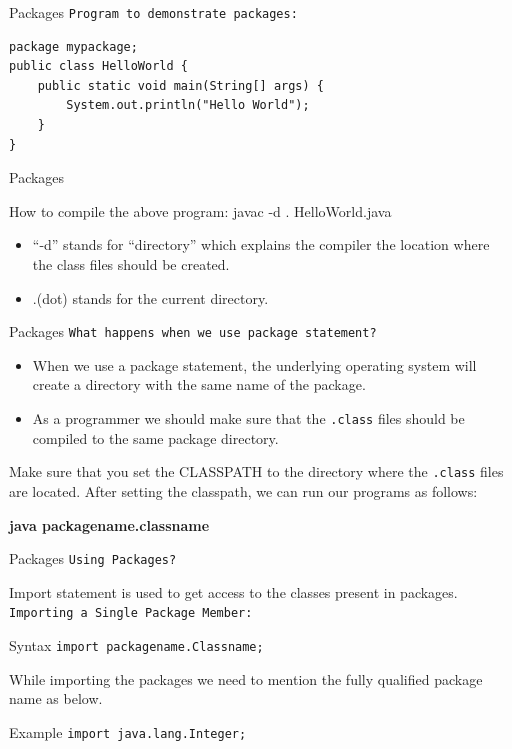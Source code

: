 \documentclass[14pt]{beamer}
\begin{document}
\begin{frame}[fragile]{Packages}
\texttt{Program to demonstrate packages:}
\begin{lstlisting}[numbers=none]
package mypackage;
public class HelloWorld {
    public static void main(String[] args) {
        System.out.println("Hello World");
    }
}
\end{lstlisting}
\end{frame}

\begin{frame}{Packages}
\begin{block}{How to compile the above program:}
javac -d . HelloWorld.java
\end{block}
\begin{itemize}
 \item ``-d'' stands for ``directory'' which explains the compiler the location where the class files should be created.
 \item  .(dot) stands for the current directory.
\end{itemize}
\end{frame}

\begin{frame}{Packages}
\texttt{What happens when we use package statement?} 
\begin{itemize}
 \item When we use a package statement, the underlying operating system will create a directory  with the same name of the package.
 \item As a programmer we should make sure that the \lstinline!.class! files should be compiled to the same package directory.
\end{itemize}
Make sure that you set the CLASSPATH to the directory where the \lstinline!.class! files are located. After setting the classpath, we can run our programs as follows:

\textbf{java packagename.classname }
\end{frame}


\begin{frame}{Packages}
 \texttt{Using Packages?}
 
 Import statement is used to get access to the classes present in packages.
 \texttt{Importing a Single Package Member:}
 \begin{block}{Syntax}
  \lstinline!import packagename.Classname;!
 \end{block}
While importing the packages we need to mention the fully qualified package name as below.
\begin{block}{Example}
 \lstinline!import java.lang.Integer;!
\end{block}
\end{frame}
\end{document}
